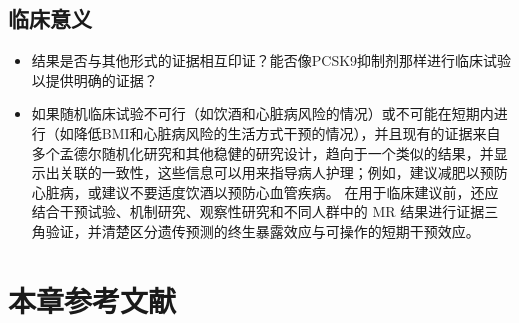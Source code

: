 \documentclass[
  chinese-hans,
  letterpaper,
  DIV=11,
  numbers=noendperiod]{scrreprt}
\providecommand{\tightlist}{%
  \setlength{\itemsep}{0pt}\setlength{\parskip}{0pt}}
\begin{document}
\subsection{临床意义}\label{ux4e34ux5e8aux610fux4e49}

\begin{itemize}
\tightlist
\item
  结果是否与其他形式的证据相互印证？能否像PCSK9抑制剂那样进行临床试验以提供明确的证据？
\item
  如果随机临床试验不可行（如饮酒和心脏病风险的情况）或不可能在短期内进行（如降低BMI和心脏病风险的生活方式干预的情况），并且现有的证据来自多个孟德尔随机化研究和其他稳健的研究设计，趋向于一个类似的结果，并显示出关联的一致性，这些信息可以用来指导病人护理；例如，建议减肥以预防心脏病，或建议不要适度饮酒以预防心血管疾病。
  在用于临床建议前，还应结合干预试验、机制研究、观察性研究和不同人群中的
  MR
  结果进行证据三角验证，并清楚区分遗传预测的终生暴露效应与可操作的短期干预效应。
\end{itemize}

\section{本章参考文献}\label{ux672cux7ae0ux53c2ux8003ux6587ux732e}
\end{document}
